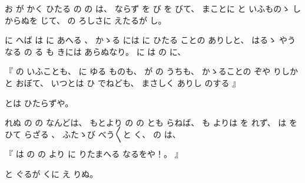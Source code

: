 %
お
が
かく
ひたる
の
の
は、
%
ならず
を
び
を
びて、
%
まことに
と
いふものゝ%
しからぬを
じて、
%
の
ろしさに
えたるが
し。

%
に
へば
は
に
あへる
、
%
かゝる%
には
に
ひたる
ことの
ありしと、
%
はるゝ%
やうなる
の%
る
も
きには
あらぬなり。
%
に
は
の
に、

%
『
の
いふことも、
%
に
ゆる
ものも、
%
が
の%
うちも、
%
かゝることの%
ぞや
りしかと
おぼ{}て、
%
いつとは
ひ
でねども、
%
まさしく
ありし
のする%
』

%
とは
ひたらずや。

%
れぬ
の
の
なんどは、
%
もとより
の
の
とも
らねば、
%
も
よりは
を
れず、
%
は
を
ひて
らざる
、
%
ふたゝび%
べう〳〵と
く、
%
の
は、

%
『
は
の
の
より
に
りたまへる
なるをや！。
』

%
と
ぐるが
くに
え
りぬ。
